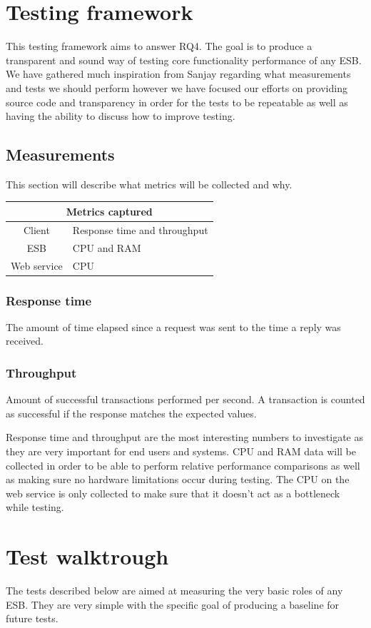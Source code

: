 \section{Testing framework}
This testing framework aims to answer RQ4. The goal is to produce a transparent and sound way of testing core functionality \cite{lit review} performance of any ESB. 
We have gathered much inspiration from Sanjay \cite{Sanjay} regarding what measurements and tests we should perform however we have focused our efforts on providing source code and transparency in order for the tests to be repeatable as well as having the ability to discuss how to improve testing.

\subsection{Measurements}
This section will describe what metrics will be collected and why.

\begin{tabular}{| c | l |}
	\hline
	\multicolumn{2}{|c|}{Metrics captured} \\
	\hline
	Client & Response time and throughput \\ \hline
	ESB & CPU and RAM \\ \hline
	Web service &  CPU \\ \hline
\end{tabular}
\subsubsection{Response time}
The amount of time elapsed since a request was sent to the time a reply was received.
\subsubsection{Throughput}
Amount of successful transactions performed per second. A transaction is counted as successful if the response matches the expected values.


Response time and throughput are the most interesting numbers to investigate as they are very important for end users and systems. CPU and RAM data will be collected in order to be able to perform relative performance comparisons as well as making sure no hardware limitations occur during testing. The CPU on the web service is only collected to make sure that it doesn't act as a bottleneck while testing. 

\section{Test walktrough}
The tests described below are aimed at measuring the very basic roles of any ESB. They are very simple with the specific goal of producing a baseline for future tests.


